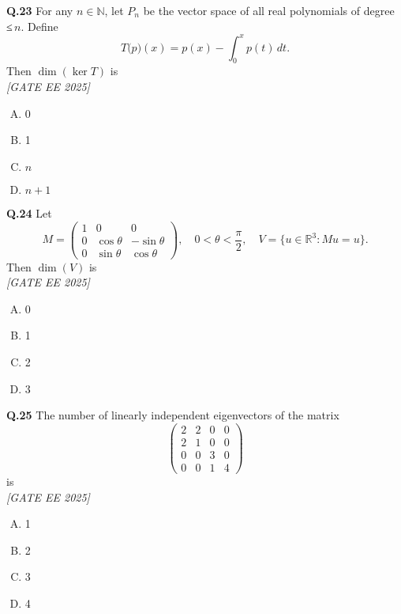 \documentclass[11pt]{article}
\begin{document}
\vspace{0.5cm}

\noindent\textbf{Q.23}  
For any \(n \in \mathbb{N}\), let \(P_n\) be the vector space of all real polynomials of degree ≤ \(n\). Define  
\[
T\bigl(p\bigr)(x) = p(x) - \int_{0}^{x} p(t)\,dt.
\]
Then \(\dim(\ker T)\) is  
\\[1ex] \textit{[GATE EE 2025]}

\begin{enumerate}[(A)]
\item 0 \item 1 \item \(n\) \item \(n+1\)
\end{enumerate}

\vspace{0.5cm}

\noindent\textbf{Q.24}  
Let  
\[
M = \begin{pmatrix}
1 & 0 & 0 \\
0 & \cos\theta & -\sin\theta \\
0 & \sin\theta & \cos\theta
\end{pmatrix}, \quad 0 < \theta < \frac{\pi}{2}, \quad
V = \{ u \in \mathbb{R}^3 : Mu = u \}.
\]
Then \(\dim(V)\) is  
\\[1ex] \textit{[GATE EE 2025]}

\begin{enumerate}[(A)]
\item 0 \item 1 \item 2 \item 3
\end{enumerate}

\vspace{0.5cm}

\noindent\textbf{Q.25}  
The number of linearly independent eigenvectors of the matrix  
\[
\begin{pmatrix}
2 & 2 & 0 & 0 \\
2 & 1 & 0 & 0 \\
0 & 0 & 3 & 0 \\
0 & 0 & 1 & 4
\end{pmatrix}
\]
is  
\\[1ex] \textit{[GATE EE 2025]}

\begin{enumerate}[(A)]
\item 1 \item 2 \item 3 \item 4
\end{enumerate}
\end{document}

